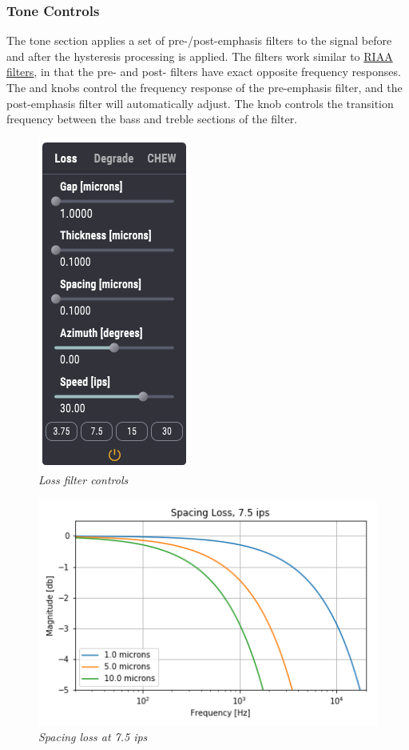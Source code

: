 \documentclass[landscape,twocolumn,a5paper]{manual}
\begin{document}
\subsubsection{Tone Controls}
The tone section applies a set of pre-/post-emphasis filters
to the signal before and after the hysteresis processing
is applied. The filters work similar to
\href{https://en.wikipedia.org/wiki/RIAA_equalization}{RIAA filters},
in that the pre- and post- filters have exact opposite frequency
responses.
\newpar
The  and  knobs control
the frequency response of the pre-emphasis filter, and the
post-emphasis filter will automatically adjust. The
 knob controls the transition frequency
between the bass and treble sections of the filter.

\begin{figure}[ht]
    \center
    \includegraphics[height=0.32\paperheight]{../Plugin/Screenshots/Loss.png}
    \caption{\label{h_bias}{\it Loss filter controls}}
\end{figure}
%
\begin{figure}[ht]
    \center
    \includegraphics[width=0.85\columnwidth]{../Simulations/LossEffects/space_loss.png}
    \caption{\label{spacing_loss}{\it Spacing loss at 7.5 ips}}
\end{figure}
\end{document}
